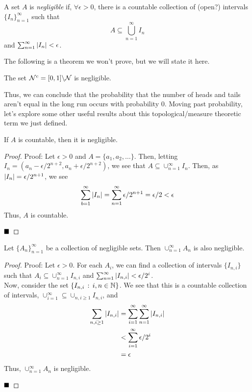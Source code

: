 \begin{definition}
    A set $A$ is \emph{negligible} if, $\forall \epsilon > 0$, there is a countable collection of (open?) intervals $\{I_{n}\}_{n = 1}^{\infty}$ such that
    \[ A \subseteq \bigcup_{n = 1}^{\infty} I_{n} \]
    and $\sum_{n = 1}^{\infty} \abs{I_{n}} < \epsilon$. 
\end{definition}
\clearpage

The following is a theorem we won't prove, but we will state it here. 

\begin{theorem}
    The set $\mathcal{N}^{c} = [0, 1] \backslash \cal{N}$ is negligible. 
\end{theorem}
Thus, we can conclude that the probability that the number of heads and tails aren't equal in the long run occurs with probability 0. Moving past probability, let's explore some other useful results about this topological/measure theoretic term we just defined.

\begin{lemma}
    If $A$ is countable, then it is negligible. 
\end{lemma}
\begin{proof}{Proof:}
    Let $\epsilon > 0$ and $A = \{a_1, a_2, \ldots\}$. Then, letting $I_{n} = (a_{n} - \epsilon / 2^{n + 2}, a_{n} + \epsilon / 2^{n + 2})$, we see that $A \subseteq \cup_{n = 1}^{\infty} I_{n}$. Then, as $\abs{I_{n}} = \epsilon/2^{n + 1}$, we see
    \[ \sum_{b = 1}^{\infty} \abs{I_{n}} = \sum_{n = 1}^{\infty} \epsilon / 2^{n + 1} = \epsilon/2 < \epsilon \]
    Thus, $A$ is countable. 

    $\qed$
\end{proof}

\begin{lemma}
    Let $\{A_{n}\}_{n = 1}^{\infty}$ be a collection of negligible sets. Then $\cup_{n = 1}^{\infty} A_{n}$ is also negligible. 
\end{lemma}
\begin{proof}{Proof:}
    Let $\epsilon > 0$. For each $A_{i}$, we can find a collection of intervals $\{I_{n, i}\}$ such that $A_i \subseteq \cup_{n = 1}^{\infty} I_{n, i}$ and $\sum_{n = 1}^{\infty} \abs{I_{n, i}} < \epsilon / 2^{i}$.\\
    
    Now, consider the set $\{I_{n, i} \col i, n \in \N\}$. We see that this is a countable collection of intervals, $\cup_{i = 1}^{\infty} \subseteq \cup_{n, i \geq 1} I_{n, i}$, and
    \begin{align*}
        \sum_{n, i \geq 1} \abs{I_{n, i}} &= \sum_{i = 1}^{\infty} \sum_{n = 1}^{\infty} \abs{I_{n, i}}\\
        &< \sum_{i = 1}^{\infty} \epsilon / 2^{i}\\
        &= \epsilon
    \end{align*} 
    Thus, $\cup_{n = 1}^{\infty} A_{n}$ is negligible.

    $\qed$
\end{proof}
\clearpage

